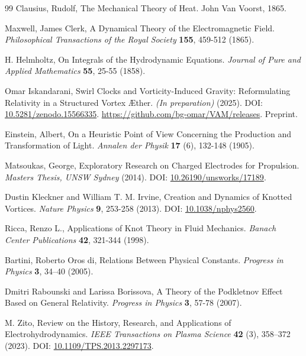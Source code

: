 \documentclass[a4paper,12pt]{article}
\begin{document}
\begin{thebibliography}{99}
Clausius, Rudolf,
\newblock The Mechanical Theory of Heat.
\newblock John Van Voorst, 1865.


Maxwell, James Clerk,
\newblock A Dynamical Theory of the Electromagnetic Field.
\textit{Philosophical Transactions of the Royal Society} \textbf{155}, 459-512 (1865).


H. Helmholtz,
\newblock On Integrals of the Hydrodynamic Equations.
\textit{Journal of Pure and Applied Mathematics} \textbf{55}, 25-55 (1858).


Omar Iskandarani,
\newblock Swirl Clocks and Vorticity-Induced Gravity: Reformulating Relativity in a Structured Vortex Æther.
\textit{(In preparation)} (2025).
\newblock DOI: \href{https://doi.org/10.5281/zenodo.15566335}{10.5281/zenodo.15566335}.
\newblock \url{https://github.com/bg-omar/VAM/releases}.
\newblock Preprint.


Einstein, Albert,
\newblock On a Heuristic Point of View Concerning the Production and Transformation of Light.
\textit{Annalen der Physik} \textbf{17} (6), 132-148 (1905).


Matsoukas, George,
\newblock Exploratory Research on Charged Electrodes for Propulsion.
\textit{Masters Thesis, UNSW Sydney} (2014).
\newblock DOI: \href{https://doi.org/10.26190/unsworks/17189}{10.26190/unsworks/17189}.


Dustin Kleckner and William T. M. Irvine,
\newblock Creation and Dynamics of Knotted Vortices.
\textit{Nature Physics} \textbf{9}, 253-258 (2013).
\newblock DOI: \href{https://doi.org/10.1038/nphys2560}{10.1038/nphys2560}.


Ricca, Renzo L.,
\newblock Applications of Knot Theory in Fluid Mechanics.
\textit{Banach Center Publications} \textbf{42}, 321-344 (1998).


Bartini, Roberto Oros di,
\newblock Relations Between Physical Constants.
\textit{Progress in Physics} \textbf{3}, 34--40 (2005).


Dmitri Rabounski and Larissa Borissova,
\newblock A Theory of the Podkletnov Effect Based on General Relativity.
\textit{Progress in Physics} \textbf{3}, 57-78 (2007).


M. Zito,
\newblock Review on the History, Research, and Applications of Electrohydrodynamics.
\textit{IEEE Transactions on Plasma Science} \textbf{42} (3), 358--372 (2023).
\newblock DOI: \href{https://doi.org/10.1109/TPS.2013.2297173}{10.1109/TPS.2013.2297173}.



\end{thebibliography}
\end{document}
